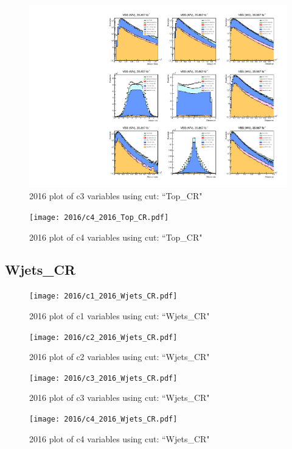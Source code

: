 \documentclass{article}
\begin{document}
                        \begin{figure}[H]
                            \centering
                            \caption{2016 plot of c3 variables using cut: ``Top\_CR"}
                            \includegraphics[width=\textwidth]{2016/c3_2016_Top_CR.pdf}
                        \end{figure}    
                        \begin{figure}[H]
                            \centering
                            \caption{2016 plot of c4 variables using cut: ``Top\_CR"}
                            \texttt{[image: 2016/c4\_2016\_Top\_CR.pdf]}
                        \end{figure}    
      \subsection*{Wjets\_CR}
                        \begin{figure}[H]
                            \centering
                            \caption{2016 plot of c1 variables using cut: ``Wjets\_CR"}
                            \texttt{[image: 2016/c1\_2016\_Wjets\_CR.pdf]}
                        \end{figure}    
                        \begin{figure}[H]
                            \centering
                            \caption{2016 plot of c2 variables using cut: ``Wjets\_CR"}
                            \texttt{[image: 2016/c2\_2016\_Wjets\_CR.pdf]}
                        \end{figure}    
                        \begin{figure}[H]
                            \centering
                            \caption{2016 plot of c3 variables using cut: ``Wjets\_CR"}
                            \texttt{[image: 2016/c3\_2016\_Wjets\_CR.pdf]}
                        \end{figure}    
                        \begin{figure}[H]
                            \centering
                            \caption{2016 plot of c4 variables using cut: ``Wjets\_CR"}
                            \texttt{[image: 2016/c4\_2016\_Wjets\_CR.pdf]}
                        \end{figure}    
\end{document}
